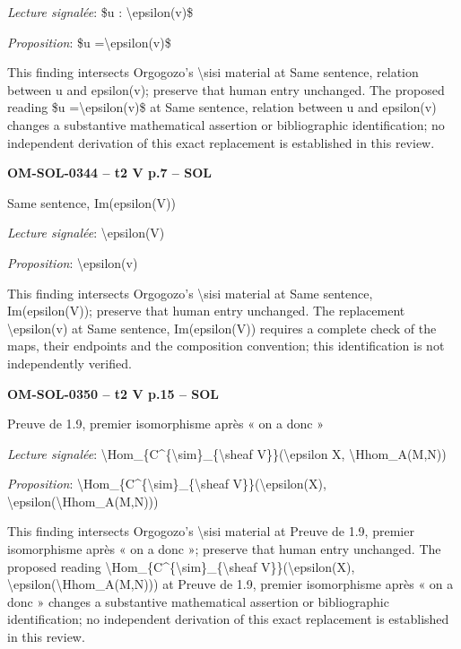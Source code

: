 \emph{Lecture signalée}: \$u : \textbackslash{}epsilon(v)\$\par
\emph{Proposition}: \$u =\allowbreak  \textbackslash{}epsilon(v)\$\par
This finding intersects Orgogozo's \textbackslash{}sisi material at Same sentence, relation between u and epsilon(v); preserve that human entry unchanged. The proposed reading \$u =\allowbreak  \textbackslash{}epsilon(v)\$ at Same sentence, relation between u and epsilon(v) changes a substantive mathematical assertion or bibliographic identification; no independent derivation of this exact replacement is established in this review.\par
\par\noindent\textbf{OM-SOL-0344 -- t2 V p.7 -- SOL}\par
Same sentence, Im(epsilon(V))\par
\emph{Lecture signalée}: \textbackslash{}epsilon(V)\par
\emph{Proposition}: \textbackslash{}epsilon(v)\par
This finding intersects Orgogozo's \textbackslash{}sisi material at Same sentence, Im(epsilon(V)); preserve that human entry unchanged. The replacement \textbackslash{}epsilon(v) at Same sentence, Im(epsilon(V)) requires a complete check of the maps, their endpoints and the composition convention; this identification is not independently verified.\par
\par\noindent\textbf{OM-SOL-0350 -- t2 V p.15 -- SOL}\par
Preuve de 1.9, premier isomorphisme après « on a donc »\par
\emph{Lecture signalée}: \textbackslash{}Hom\_\{C\textasciicircum{}\{\textbackslash{}sim\}\_\{\textbackslash{}sheaf V\}\}(\textbackslash{}epsilon X, \textbackslash{}Hhom\_A(M,N))\par
\emph{Proposition}: \textbackslash{}Hom\_\{C\textasciicircum{}\{\textbackslash{}sim\}\_\{\textbackslash{}sheaf V\}\}(\textbackslash{}epsilon(X), \textbackslash{}epsilon(\textbackslash{}Hhom\_A(M,N)))\par
This finding intersects Orgogozo's \textbackslash{}sisi material at Preuve de 1.9, premier isomorphisme après « on a donc »; preserve that human entry unchanged. The proposed reading \textbackslash{}Hom\_\{C\textasciicircum{}\{\textbackslash{}sim\}\_\{\textbackslash{}sheaf V\}\}(\textbackslash{}epsilon(X), \textbackslash{}epsilon(\textbackslash{}Hhom\_A(M,N))) at Preuve de 1.9, premier isomorphisme après « on a donc » changes a substantive mathematical assertion or bibliographic identification; no independent derivation of this exact replacement is established in this review.\par
